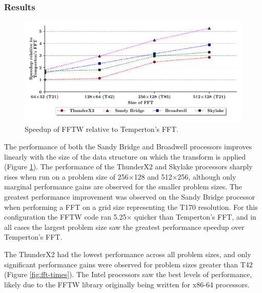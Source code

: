 \documentclass[a4paper,11pt]{report}
\begin{document}
\subsubsection{Results}

\begin{figure}[htbp]
    \centering
    \includegraphics[width=1\textwidth]{img/speedup-fft.pdf}
    \caption[Speedup of FFTW relative to Temperton's FFT]{Speedup of FFTW relative to Temperton's FFT. }
    \label{fig:fft-speedup}
\end{figure}
\par
The performance of both the Sandy Bridge and Broadwell processors improves linearly with the size of the data structure on which the transform is applied (Figure \ref{fig:fft-speedup}). The performance of the ThunderX2 and Skylake processors sharply rises when run on a problem size of 256$\times$128 and 512$\times$256, although only marginal performance gains are observed for the smaller problem sizes. The greatest performance improvement was observed on the Sandy Bridge processor when performing a FFT on a grid size representing the T170 resolution. For this configuration the FFTW code ran 5.25$\times$ quicker than Temperton's FFT, and in all cases the largest problem size saw the greatest performance speedup over Temperton's FFT.
\par
The ThunderX2 had the lowest performance across all problem sizes, and only significant performance gains were observed for problem sizes greater than T42 (Figure \ref{fig:fft-times}). The Intel processors saw the best levels of performance, likely due to the FFTW library originally being written for x86-64 processors. 
\end{document}
